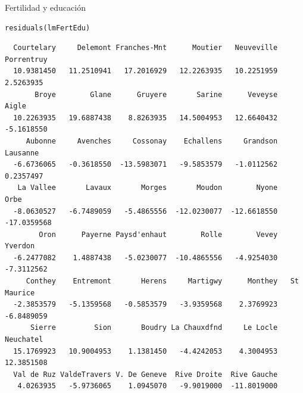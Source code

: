 \documentclass[xcolor={usenames,svgnames,dvipsnames}]{beamer}
\begin{document}
\begin{frame}[fragile,label=sec-5-3]{Fertilidad y educación}
 \lstset{language=R,label= ,caption= ,numbers=none}
\begin{lstlisting}
residuals(lmFertEdu)
\end{lstlisting}

\begin{verbatim}
  Courtelary     Delemont Franches-Mnt      Moutier   Neuveville   Porrentruy 
  10.9381450   11.2510941   17.2016929   12.2263935   10.2251959    2.5263935 
       Broye        Glane      Gruyere       Sarine      Veveyse        Aigle 
  10.2263935   19.6887438    8.8263935   14.5004953   12.6640432   -5.1618550 
     Aubonne     Avenches     Cossonay    Echallens     Grandson     Lausanne 
  -6.6736065   -0.3618550  -13.5983071   -9.5853579   -1.0112562    0.2357497 
   La Vallee       Lavaux       Morges       Moudon        Nyone         Orbe 
  -8.0630527   -6.7489059   -5.4865556  -12.0230077  -12.6618550  -17.0359568 
        Oron      Payerne Paysd'enhaut        Rolle        Vevey      Yverdon 
  -6.2477082    1.4887438   -5.0230077  -10.4865556   -4.9254030   -7.3112562 
     Conthey    Entremont       Herens     Martigwy      Monthey   St Maurice 
  -2.3853579   -5.1359568   -0.5853579   -3.9359568    2.3769923   -6.8489059 
      Sierre         Sion       Boudry La Chauxdfnd     Le Locle    Neuchatel 
  15.1769923   10.9004953    1.1381450   -4.4242053    4.3004953   12.3851508 
  Val de Ruz ValdeTravers V. De Geneve  Rive Droite  Rive Gauche 
   4.0263935   -5.9736065    1.0945070   -9.9019000  -11.8019000
\end{verbatim}
\end{frame}
\end{document}
